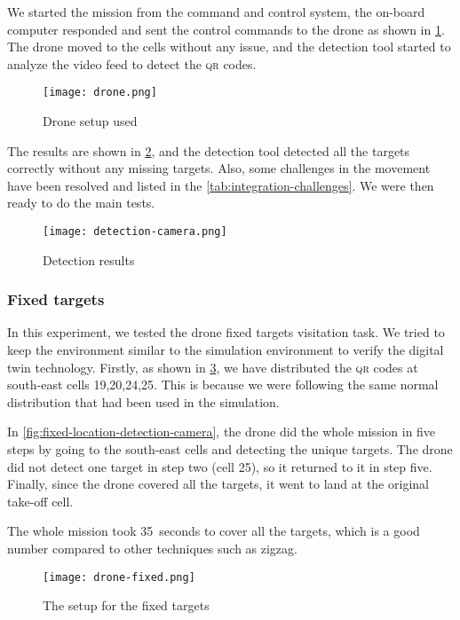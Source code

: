 \documentclass[../main.tex]{subfiles}
\begin{document}
We started the mission from the command and control system, 
the on-board computer responded and sent the control commands 
to the drone as shown in \cref{fig:experiment-drone}.
The drone moved to the cells without any issue,
and the detection tool started to analyze 
the video feed to detect the \textsc{qr} codes.

\begin{figure}[tbp]
	\centering
	\texttt{[image: drone.png]}
	\caption{Drone setup used}
	\label{fig:experiment-drone}
\end{figure} 

The results are shown in \cref{fig:detection-camera}, 
and the detection tool detected all the targets correctly 
without any missing targets. Also, some challenges 
in the movement have been resolved and listed in 
the \cref{tab:integration-challenges}. 
We were then ready to do the main tests.

\begin{figure}[tbp]
	\centering
	\texttt{[image: detection-camera.png]}
	\caption{Detection results}
	\label{fig:detection-camera}
\end{figure}

\subsubsection{Fixed targets}

In this experiment, we tested the drone fixed targets
visitation task. We tried to keep the environment similar
to the simulation environment to verify the digital twin technology.
Firstly, as shown in \cref{fig:targets-location},
we have distributed the \textsc{qr} codes at south-east cells 
{19,20,24,25}. This is because we were following 
the same normal distribution that had been used in the simulation.

In \cref{fig:fixed-location-detection-camera},
the drone did the whole mission in five steps by going
to the south-east cells and detecting the unique targets. 
The drone did not detect one target in 
step two (cell 25), so it returned to it in step five. Finally,
since the drone covered all the targets, it 
went to land at the original take-off cell.

The whole mission took \SI{35}{seconds} to cover all the targets,
which is a good number compared to other techniques such as zigzag.

\begin{figure}[tbp]
	\centering
	\texttt{[image: drone-fixed.png]}
	\caption{The setup for the fixed targets}
	\label{fig:targets-location}
\end{figure}
\end{document}
